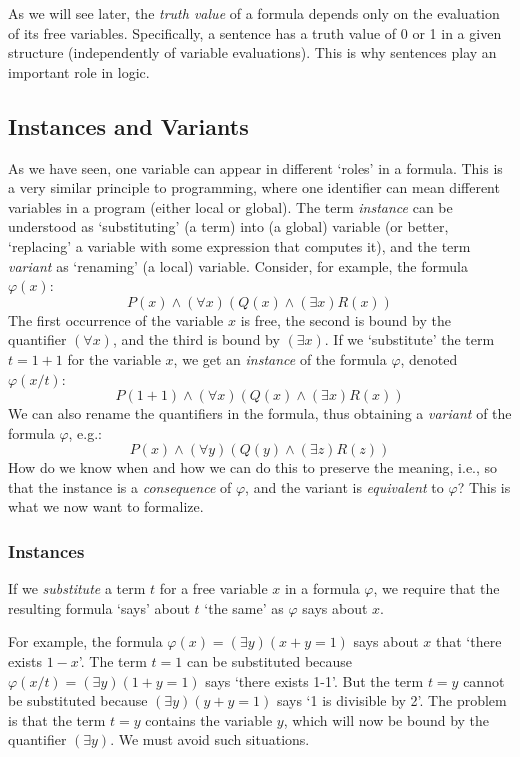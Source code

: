 \begin{remark}
As we will see later, the \emph{truth value} of a formula depends only on the evaluation of its free variables. Specifically, a sentence has a truth value of 0 or 1 in a given structure (independently of variable evaluations). This is why sentences play an important role in logic.
\end{remark}


\subsection{Instances and Variants}

As we have seen, one variable can appear in different `roles' in a formula. This is a very similar principle to programming, where one identifier can mean different variables in a program (either local or global). The term \emph{instance} can be understood as `substituting' (a term) into (a global) variable (or better, `replacing' a variable with some expression that computes it), and the term \emph{variant} as `renaming' (a local) variable. Consider, for example, the formula $\varphi(x)$:
$$
P(x)\land (\forall x)(Q(x) \land (\exists x)R(x))
$$
The first occurrence of the variable $x$ is free, the second is bound by the quantifier $(\forall x)$, and the third is bound by $(\exists x)$. If we `substitute' the term $t=1+1$ for the variable $x$, we get an \emph{instance} of the formula $\varphi$, denoted $\varphi(x/t)$:
$$
P(1+1)\land (\forall x)(Q(x) \land (\exists x)R(x))
$$
We can also rename the quantifiers in the formula, thus obtaining a \emph{variant} of the formula $\varphi$, e.g.:
$$
P(x)\land (\forall y)(Q(y) \land (\exists z)R(z))
$$
How do we know when and how we can do this to preserve the meaning, i.e., so that the instance is a \emph{consequence} of $\varphi$, and the variant is \emph{equivalent} to $\varphi$? This is what we now want to formalize.


\subsubsection{Instances}

If we \emph{substitute} a term $t$ for a free variable $x$ in a formula $\varphi$, we require that the resulting formula `says' about $t$ `the same' as $\varphi$ says about $x$.

\begin{example}
    For example, the formula $\varphi(x)=(\exists y)(x+y=1)$ says about $x$ that `there exists $1-x$'. The term $t=1$ can be substituted because $\varphi(x/t)=(\exists y)(1+y=1)$ says `there exists 1-1'. But the term $t=y$ cannot be substituted because $(\exists y)(y+y=1)$ says `1 is divisible by 2'. The problem is that the term $t=y$ contains the variable $y$, which will now be bound by the quantifier $(\exists y)$. We must avoid such situations.
\end{example}

